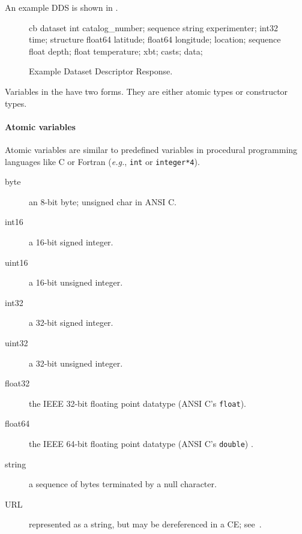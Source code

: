 \documentclass[justify]{nasa-ese}
\renewcommand{\Figureref}[2][here]{\texorhtml{Figure~\ref{#2}}{\link{#1}{#2}}}
\begin{document}
An example DDS is shown in \Figureref[Figure 7]{fig-dds}.

\begin{figure}
\begin{vcode}{cb}
dataset {
   int catalog_number;
   sequence {
      string experimenter;
      int32 time;
      structure {
         float64 latitude;
         float64 longitude;
      } location;
      sequence {
         float depth;
         float temperature;
      } xbt;
   } casts;
} data;
\end{vcode}
\caption{Example Dataset Descriptor Response.}
\label{fig-dds}
\end{figure}

Variables in the \DAP have two forms. They are either atomic types or
constructor types.



\paragraph{Atomic variables}
Atomic variables are similar to predefined variables in procedural
programming languages like C or Fortran ({\it e.g.}, \texttt{int} or
\texttt{integer*4}).

\begin{description}
\item [byte] an 8-bit byte; unsigned char in ANSI C\@.
\item [int16] a 16-bit signed integer.
\item [uint16] a 16-bit unsigned integer.
\item [int32] a 32-bit signed integer.
\item [uint32] a 32-bit unsigned integer.
\item [float32] the IEEE 32-bit floating point datatype (ANSI C's
  \texttt{float}). 
\item [float64] the IEEE 64-bit floating point datatype (ANSI C's
  \texttt{double}) .
\item [string] a sequence of bytes terminated by a null character.
\item [URL] represented as a string, but may be dereferenced in a \ac{CE};
  see~.
\end{description}
\end{document}
